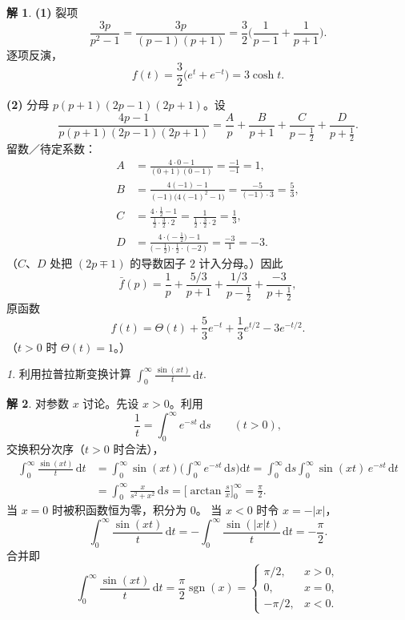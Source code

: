 \documentclass[11pt]{article}
\theoremstyle{remark}
\newtheorem{problem}{}
\theoremstyle{definition}
\newtheorem{solution}{解}
\begin{document}
\begin{solution}
\noindent\textbf{(1)}
裂项
\[
\frac{3p}{p^2-1}
=\frac{3p}{(p-1)(p+1)}
=\frac{3}{2}\Biggl(\frac{1}{p-1}+\frac{1}{p+1}\Biggr).
\]
逐项反演，
\[
f(t)
=\frac{3}{2}\bigl(e^{t}+e^{-t}\bigr)
=3\cosh t.
\]

\medskip
\noindent\textbf{(2)}
分母 $p(p+1)(2p-1)(2p+1)$。设
\[
\frac{4p-1}{p(p+1)(2p-1)(2p+1)}
=\frac{A}{p}+\frac{B}{p+1}+\frac{C}{p-\tfrac12}+\frac{D}{p+\tfrac12}.
\]
留数／待定系数：
\begin{align*}
A
&=\frac{4\cdot 0-1}{(0+1)(0-1)}=\frac{-1}{-1}=1,\\
B
&=\frac{4(-1)-1}{(-1)\bigl(4(-1)^2-1\bigr)}
=\frac{-5}{(-1)\cdot 3}=\frac{5}{3},\\
C
&=\frac{4\cdot\tfrac12-1}{\tfrac12\cdot\tfrac32\cdot 2}
=\frac{1}{\tfrac12\cdot\tfrac32\cdot 2}=\frac{1}{3},\\
D
&=\frac{4\cdot\bigl(-\tfrac12\bigr)-1}{\bigl(-\tfrac12\bigr)\cdot\tfrac12\cdot(-2)}
=\frac{-3}{1}=-3.
\end{align*}
（$C$、$D$ 处把 $(2p\mp 1)$ 的导数因子 $2$ 计入分母。）因此
\[
\bar f(p)
=\frac{1}{p}+\frac{5/3}{p+1}+\frac{1/3}{p-\tfrac12}+\frac{-3}{p+\tfrac12},
\]
原函数
\[
f(t)
=\Theta(t)
+\frac{5}{3}e^{-t}
+\frac{1}{3}e^{t/2}
-3e^{-t/2}.
\]
（$t>0$ 时 $\Theta(t)=1$。）
\end{solution}

\begin{problem}
  利用拉普拉斯变换计算
  $\displaystyle\int_0^{\infty}\frac{\sin(xt)}{t}\,\mathrm{d}t$.
\end{problem}

\begin{solution}
对参数 $x$ 讨论。先设 $x>0$。利用
\[
\frac{1}{t}=\int_0^{\infty}e^{-st}\,\mathrm{d}s
\qquad(t>0),
\]
交换积分次序（$t>0$ 时合法），
\begin{align*}
\int_0^{\infty}\frac{\sin(xt)}{t}\,\mathrm{d}t
&=\int_0^{\infty}\sin(xt)
  \Biggl(\int_0^{\infty}e^{-st}\,\mathrm{d}s\Biggr)\mathrm{d}t
=\int_0^{\infty}\mathrm{d}s
  \int_0^{\infty}\sin(xt)\,e^{-st}\,\mathrm{d}t
\\
&=\int_0^{\infty}\frac{x}{s^2+x^2}\,\mathrm{d}s
=\Biggl[\arctan\frac{s}{x}\Biggr]_0^{\infty}
=\frac{\pi}{2}.
\end{align*}
当 $x=0$ 时被积函数恒为零，积分为 $0$。
当 $x<0$ 时令 $x=-|x|$，
\[
\int_0^{\infty}\frac{\sin(xt)}{t}\,\mathrm{d}t
=-\int_0^{\infty}\frac{\sin(|x|t)}{t}\,\mathrm{d}t
=-\frac{\pi}{2}.
\]
合并即
\[
\int_0^{\infty}\frac{\sin(xt)}{t}\,\mathrm{d}t
=\frac{\pi}{2}\operatorname{sgn}(x)
=
\begin{cases}
\pi/2, & x>0,\\
0, & x=0,\\
-\pi/2, & x<0.
\end{cases}
\]
\end{solution}
\end{document}
